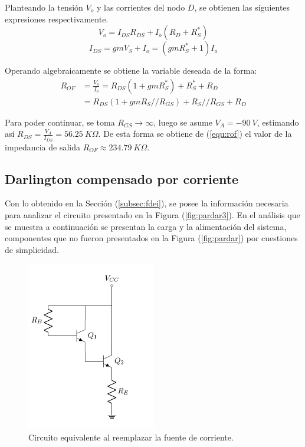 Planteando la tensión $V_o$ y las corrientes del nodo $D$, se obtienen las siguientes expresiones respectivamente.
\begin{equation*}
	V_o = I_{DS} R_{DS} + I_o \left( R_D + R_S^* \right)
\end{equation*}
\begin{equation*}
	I_{DS} = gm V_S + I_o = \left( gm R_S^* + 1 \right) I_o
\end{equation*}

Operando algebraicamente se obtiene la variable deseada de la forma:
\begin{equation}
\begin{split}
	R_{OF} & = \frac{V_o}{I_o} = R_{DS} \left( 1 + gm R_S^* \right) + R_S^* + R_D \\
		   & = R_{DS} \left( 1 + gm R_S//R_{GS} \right) + R_S//R_{GS} + R_D
\end{split}
\label{equ:rof}
\end{equation}

Para poder continuar, se toma $R_{GS} \longrightarrow \infty$, luego se asume $V_A = -90 \ V$, estimando así $R_{DS} = \frac{V_A}{I_{DS}} = 56.25 \ K\Omega$. De esta forma se obtiene de (\ref{equ:rof}) el valor de la impedancia de salida $R_{OF} \approx 234.79 \ K\Omega$.

\subsection{Darlington compensado por corriente}
Con lo obtenido en la Sección (\ref{subsec:fdei}), se posee la información necesaria para analizar el circuito presentado en la Figura (\ref{fig:pardar3}). En el análisis que se muestra a continuación se presentan la carga y la alimentación del sistema, componentes que no fueron presentados en la Figura (\ref{fig:pardar}) por cuestiones de simplicidad.
\begin{figure}[H]
\centering
	\includegraphics[width=0.5\textwidth, page=5]{Imagenes/ParDarlington.pdf}
	\caption{Circuito equivalente al reemplazar la fuente de corriente.}
	\label{fig:pardar4}
\end{figure}

